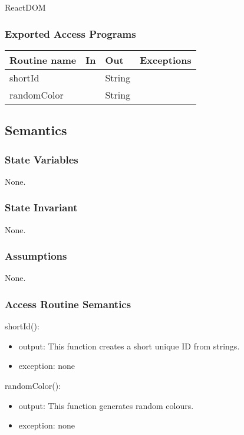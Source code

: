 \documentclass[12pt, titlepage]{article}
\begin{document}
ReactDOM

\subsubsection{Exported Access Programs}

\begin{tabular}{| l | l | l | l |}
  \hline
  \textbf{Routine name} & \textbf{In} & \textbf{Out} & \textbf{Exceptions}\\
  \hline
  shortId & ~ & String & ~\\
  \hline
  randomColor & ~ & String & ~\\
  \hline
\end{tabular}

\subsection{Semantics}

\subsubsection{State Variables}

None.

\subsubsection{State Invariant}

None.

\subsubsection{Assumptions}

None.

\subsubsection{Access Routine Semantics}

\noindent shortId():
\begin{itemize}
\item output: This function creates a short unique ID from strings.
\item exception: none
\end{itemize}

\noindent randomColor():
\begin{itemize}
\item output: This function generates random colours.
\item exception: none
\end{itemize}
\end{document}
